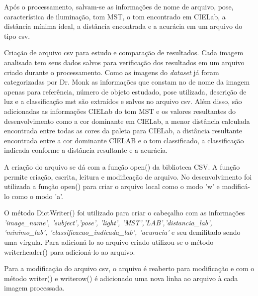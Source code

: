 Após o processamento, salvam-se as informações de nome de arquivo, pose, característica de iluminação, tom MST, o tom encontrado em CIELab, a distância mínima ideal, a distância encontrada e a acurácia em um arquivo do tipo csv.

Criação de arquivo csv para estudo e comparação de resultados. Cada imagem analisada tem seus dados salvos para verificação dos resultados em um arquivo criado durante o processamento. Como as imagens do \textit{dataset} já foram categorizadas por Dr. Monk as informações que constam no de nome da imagem apenas para referência, número de objeto estudado, pose utilizada, descrição de luz e a classificação mst são extraídos e salvos no arquivo csv. Além disso, são adicionadas as informações CIELab do tom MST e os valores resultantes do desenvolvimento como a cor dominante em CIELab, a menor distância calculada encontrada entre todas as cores da paleta para CIELab, a distância resultante encontrada entre a cor dominante CIELAB e o tom classificado, a classificação indicada conforme a distância resultante e a acurácia.

A criação do arquivo se dá com a função open() da biblioteca CSV. A função permite criação, escrita, leitura e modificação de arquivo. No desenvolvimento foi utilizada a função open() para criar o arquivo local  como o modo 'w' e modificá-lo como o modo 'a'.

O método DictWriter() foi utilizado para criar o cabeçalho com as informações \textit{'image\_name', 'subject','pose', 'light', 'MST','LAB','distancia_lab', 'minimo\_lab', 'classificacao_indicada_lab', 'acuracia'} e seu demilitado sendo uma vírgula. Para adicioná-lo ao arquivo criado utilizou-se o método writerheader() para adicioná-lo ao arquivo.

Para a modificação do arquivo csv, o arquivo é reaberto para modificação e com o método writer() e writerow() é adicionado uma nova linha ao arquivo à cada imagem processada.

